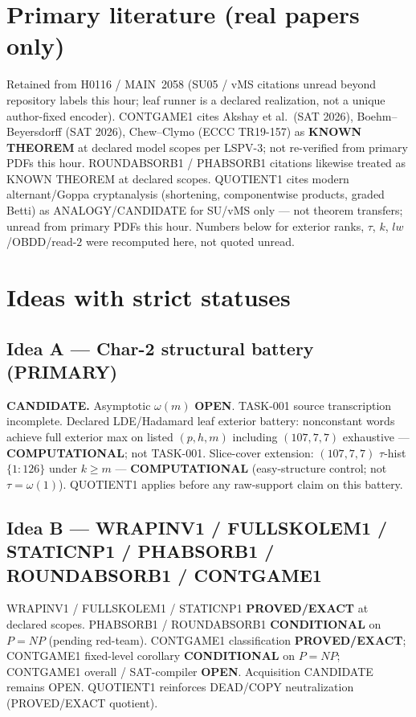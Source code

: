 \documentclass[11pt]{article}
\begin{document}
\section*{Primary literature (real papers only)}
Retained from H0116 / MAIN~2058 (SU05 / vMS citations unread beyond repository labels this hour;
leaf runner is a declared realization, not a unique author-fixed encoder).
CONTGAME1 cites Akshay et al.\ (SAT 2026), Boehm--Beyersdorff (SAT 2026),
Chew--Clymo (ECCC TR19-157) as \textbf{KNOWN THEOREM} at declared model scopes per LSPV-3;
not re-verified from primary PDFs this hour.
ROUNDABSORB1 / PHABSORB1 citations likewise treated as KNOWN THEOREM at declared scopes.
QUOTIENT1 cites modern alternant/Goppa cryptanalysis (shortening, componentwise products,
graded Betti) as ANALOGY/CANDIDATE for SU/vMS only --- not theorem transfers; unread from
primary PDFs this hour.
Numbers below for exterior ranks, $\tau$, $k$, $lw$/OBDD/read-$2$
were recomputed here, not quoted unread.

\section*{Ideas with strict statuses}
\subsection*{Idea A --- Char-2 structural battery (PRIMARY)}
\textbf{CANDIDATE.} Asymptotic $\omega(m)$ \textbf{OPEN}. TASK-001 source transcription incomplete.
Declared LDE/Hadamard leaf exterior battery: nonconstant words achieve full exterior max on
listed $(p,h,m)$ including $(107,7,7)$ exhaustive --- \textbf{COMPUTATIONAL}; not TASK-001.
Slice-cover extension: $(107,7,7)$ $\tau$-hist $\{1{:}126\}$ under $k{\ge}m$ ---
\textbf{COMPUTATIONAL} (easy-structure control; not $\tau=\omega(1)$).
QUOTIENT1 applies before any raw-support claim on this battery.

\subsection*{Idea B --- WRAPINV1 / FULLSKOLEM1 / STATICNP1 / PHABSORB1 / ROUNDABSORB1 / CONTGAME1}
WRAPINV1 / FULLSKOLEM1 / STATICNP1 \textbf{PROVED/EXACT} at declared scopes.
PHABSORB1 / ROUNDABSORB1 \textbf{CONDITIONAL} on $P=NP$ (pending red-team).
CONTGAME1 classification \textbf{PROVED/EXACT}; CONTGAME1 fixed-level corollary
\textbf{CONDITIONAL} on $P=NP$; CONTGAME1 overall / SAT-compiler \textbf{OPEN}.
Acquisition CANDIDATE remains OPEN.
QUOTIENT1 reinforces DEAD/COPY neutralization (PROVED/EXACT quotient).
\end{document}
